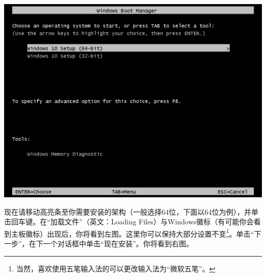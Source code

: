 \documentclass{book}
\begin{document}
\begin{center}
	\includegraphics[scale=0.4]{pic/win10setup1}
\end{center}
现在请移动高亮条至你需要安装的架构（一般选择64位，下面以64位为例），并单击回车键。在“加载文件”（英文：Loading Files）与Windows徽标（有可能你会看到主板徽标）出现后，你将看到左图。这里你可以保持大部分设置不变\footnote{当然，喜欢使用五笔输入法的可以更改输入法为“微软五笔”。}。单击“下一步”，在下一个对话框中单击“现在安装”。你将看到右图。
\end{document}
